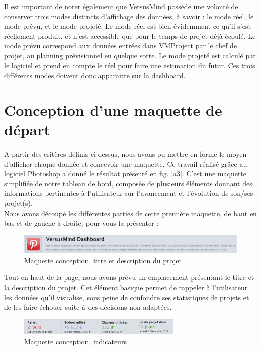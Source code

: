 \documentclass[12pt]{report}
\begin{document}
Il est important de noter également que VersusMind possède une volonté de conserver trois modes distincts d’affichage des données, à savoir : le mode réel, le mode prévu, et le mode projeté. Le mode réel est bien évidemment ce qu’il s’est réellement produit, et n’est accessible que pour le temps de projet déjà écoulé. Le mode prévu correspond aux données entrées dans VMProject par le chef de projet, au planning prévisionnel en quelque sorte. Le mode projeté est calculé par le logiciel et prend en compte le réel pour faire une estimation du futur. Ces trois différents modes doivent donc apparaitre sur la dashboard.\\

	\section{Conception d'une maquette de départ}
	
A partir des critères définis ci-dessus, nous avons pu mettre en forme le moyen d’afficher chaque donnée et concevoir une maquette. Ce travail réalisé grâce au logiciel Photoshop a donné le résultat présenté en fig. \ref{a3}. C'est une maquette simplifiée de notre tableau de bord, composée de plusieurs éléments donnant des informations pertinentes à l'utilisateur sur l'avancement et l'évolution de son/ses projet(s).\\

Nous avons découpé les différentes parties de cette première maquette, de haut en bas et de gauche à droite, pour vous la présenter :\\

\begin{figure}[H]
	\centering
	\includegraphics[width=1\textwidth]{pictures/notreMaquette/description.jpg}
	\caption{Maquette conception, titre et description du projet}
	\label{5}
\end{figure}


Tout en haut de la page, nous avons prévu un emplacement présentant le titre et la description du projet. Cet élément basique permet de rappeler à l'utilisateur les données qu'il visualise, sous peine de confondre ses statistiques de projets et de les faire échouer suite à des décisions non adaptées.\\

\begin{figure}[H]
	\centering
	\includegraphics[width=0.7\textwidth]{pictures/notreMaquette/chiffresCle.jpg}
	\caption{Maquette conception, indicateurs}
	\label{6}
\end{figure}
\end{document}
